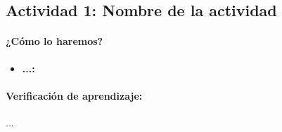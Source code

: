 \documentclass[a4,11pt]{aleph-notas}
\begin{document}
\subsection*{Actividad 1: Nombre de la actividad}


\paragraph{¿Cómo lo haremos?}  
\begin{itemize}[leftmargin=*]
    \item \textbf{...:}  %
\end{itemize}


\paragraph{Verificación de aprendizaje:}  
...
\end{document}
